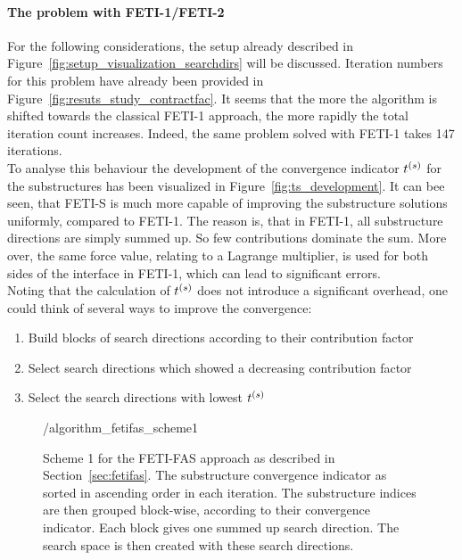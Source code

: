 \paragraph{The problem with FETI-1/FETI-2}
For the following considerations, the setup already described in Figure~\ref{fig:setup_visualization_searchdirs} will be discussed. Iteration numbers for this problem have already been provided in Figure~\ref{fig:resuts_study_contractfac}. It seems that the more the algorithm is shifted towards the classical FETI-1 approach, the more rapidly the total iteration count increases. Indeed, the same problem solved with FETI-1 takes 147 iterations.\\
To analyse this behaviour the development of the convergence indicator ${t}^{(s)}$ for the substructures has been visualized in Figure~\ref{fig:ts_development}. It can bee seen, that FETI-S is much more capable of improving the substructure solutions uniformly, compared to FETI-1. The reason is, that in FETI-1, all substructure directions are simply summed up. So few contributions dominate the sum. More over, the same force value, relating to a Lagrange multiplier, is used for both sides of the interface in FETI-1, which can lead to significant errors.\\
Noting that the calculation of ${t}^{(s)}$ does not introduce a significant overhead, one could think of several ways to improve the convergence:
\begin{enumerate}
  \item Build blocks of search directions according to their contribution factor
  \item Select search directions which showed a decreasing contribution factor
  \item Select the search directions with lowest ${t}^{(s)}$
\end{enumerate}


\begin{figure}[h!]
  \begin{center}
    {\tikzpath/algorithm_fetifas_scheme1}
    \caption[Structogram FETI-FAS scheme 1]{Scheme 1 for the FETI-FAS approach as described in Section~\ref{sec:fetifas}. The substructure convergence indicator as sorted in ascending order in each iteration. The substructure indices are then grouped block-wise, according to their convergence indicator. Each block gives one summed up search direction. The search space is then created with these search directions.}
    \label{strukt:fetifas_scheme1}
  \end{center}
\end{figure}

